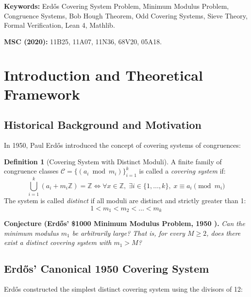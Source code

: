 \documentclass[11pt,a4paper]{article}
\theoremstyle{definition}
\newtheorem{definition}[theorem]{Definition}
\begin{document}
\vspace{0.5em}
\noindent\textbf{Keywords:} Erd\H{o}s Covering System Problem, Minimum Modulus Problem, Congruence Systems, Bob Hough Theorem, Odd Covering Systems, Sieve Theory, Formal Verification, Lean 4, Mathlib.

\noindent\textbf{MSC (2020):} 11B25, 11A07, 11N36, 68V20, 05A18.

\tableofcontents
\newpage

\section{Introduction and Theoretical Framework}

\subsection{Historical Background and Motivation}
In 1950, Paul Erd\H{o}s \cite{erdos1950} introduced the concept of covering systems of congruences:

\begin{definition}[Covering System with Distinct Moduli]\label{def:covering_system}
A finite family of congruence classes $\mathcal{C} = \{ (a_i \bmod m_i) \}_{i=1}^k$ is called a \emph{covering system} if:
\begin{equation}\label{eq:covering_def}
\bigcup_{i=1}^k (a_i + m_i \mathbb{Z}) = \mathbb{Z} \iff \forall x \in \mathbb{Z}, \; \exists i \in \{1, \dots, k\}, \; x \equiv a_i \pmod{m_i}
\end{equation}
The system is called \emph{distinct} if all moduli are distinct and strictly greater than 1:
\begin{equation}\label{eq:distinct_moduli}
1 < m_1 < m_2 < \dots < m_k
\end{equation}
\end{definition}

\noindent\textbf{Conjecture (Erd\H{o}s' \$1000 Minimum Modulus Problem, 1950 \cite{erdos1950}).} \textit{Can the minimum modulus $m_1$ be arbitrarily large? That is, for every $M \ge 2$, does there exist a distinct covering system with $m_1 > M$?}

\subsection{Erd\H{o}s' Canonical 1950 Covering System}
Erd\H{o}s \cite{erdos1950} constructed the simplest distinct covering system using the divisors of 12:
\end{document}
